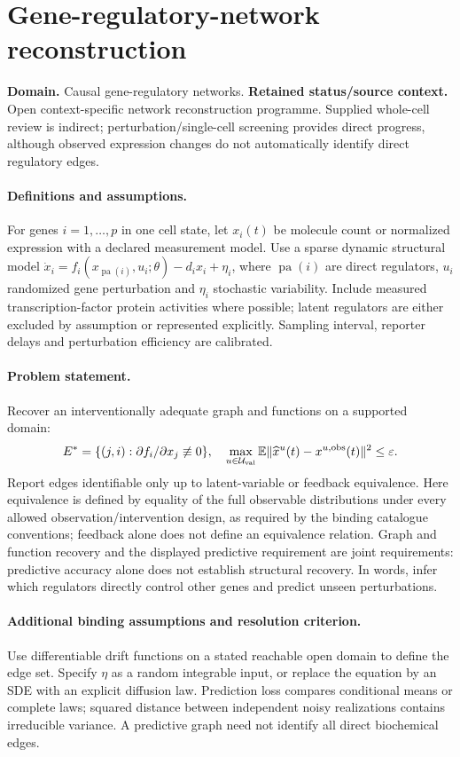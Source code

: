 \documentclass[11pt]{article}
\begin{document}
\section*{Gene-regulatory-network reconstruction}
\label{prob:046}
\label{rank:59}
\par\smallskip

\noindent\textbf{Domain.} Causal gene-regulatory networks. \quad \textbf{Retained status/source context.} Open context-specific network reconstruction programme. Supplied whole-cell review is indirect; perturbation/single-cell screening provides direct progress, although observed expression changes do not automatically identify direct regulatory edges.
\paragraph{Definitions and assumptions.} For genes $i=1,\ldots,p$ in one cell state, let $x_i(t)$ be molecule count or normalized expression with a declared measurement model. Use a sparse dynamic structural model $\dot x_i=f_i(x_{\operatorname{pa}(i)},u_i;\theta)-d_ix_i+\eta_i$, where $\operatorname{pa}(i)$ are direct regulators, $u_i$ randomized gene perturbation and $\eta_i$ stochastic variability. Include measured transcription-factor protein activities where possible; latent regulators are either excluded by assumption or represented explicitly. Sampling interval, reporter delays and perturbation efficiency are calibrated.
\paragraph{Problem statement.} Recover an interventionally adequate graph and functions on a supported domain:
\[
E^*=\{(j,i):\partial f_i/\partial x_j\not\equiv0\},
\quad\max_{u\in\mathcal U_{\rm val}}\mathbb{E}\|\widehat x^u(t)-x^{u,\rm obs}(t)\|^2\leq\varepsilon.
\]
Report edges identifiable only up to latent-variable or feedback equivalence. Here equivalence is defined by equality of the full observable distributions under every allowed observation/intervention design, as required by the binding catalogue conventions; feedback alone does not define an equivalence relation. Graph and function recovery and the displayed predictive requirement are joint requirements: predictive accuracy alone does not establish structural recovery. In words, infer which regulators directly control other genes and predict unseen perturbations.
\paragraph{Additional binding assumptions and resolution criterion.} Use differentiable drift functions on a stated reachable open domain to define the edge set. Specify $\eta$ as a random integrable input, or replace the equation by an SDE with an explicit diffusion law. Prediction loss compares conditional means or complete laws; squared distance between independent noisy realizations contains irreducible variance. A predictive graph need not identify all direct biochemical edges.
\end{document}
